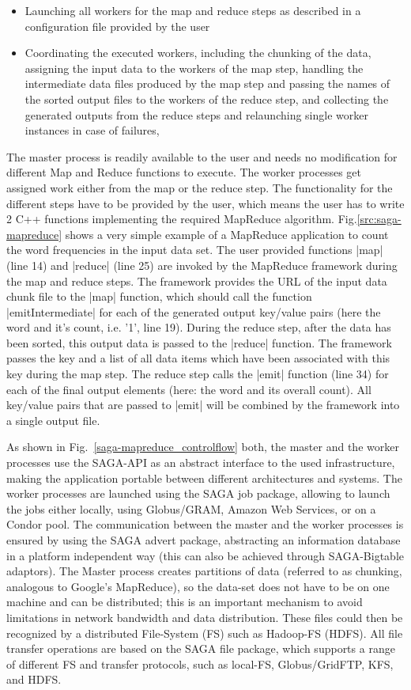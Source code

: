 \documentclass[conference,final]{IEEEtran}
\begin{document}
\begin{itemize}
\item Launching all workers for the map and reduce steps as described
  in a configuration file provided by the user 
\item Coordinating the executed workers, including the chunking of the
  data, assigning the input data to the workers of the map step,
  handling the intermediate data files produced by the map step and
  passing the names of the sorted output files to the workers of the
  reduce step, and collecting the generated outputs from the reduce
  steps and relaunching single worker instances in case of failures,
\end{itemize}

The master process is readily available to the user and needs no
modification for different Map and Reduce functions to execute.  The
worker processes get assigned work either from the map or the reduce
step. The functionality for the different steps have to be provided by
the user, which means the user has to write 2 C++ functions
implementing the required MapReduce algorithm.
Fig.\ref{src:saga-mapreduce} shows a very simple example of a
MapReduce application to count the word frequencies in the input data
set. The user provided functions |map| (line 14) and |reduce| (line
25) are invoked by the MapReduce framework during the map and reduce
steps. The framework provides the URL of the input data chunk file to
the |map| function, which should call the function |emitIntermediate|
for each of the generated output key/value pairs (here the word and
it's count, i.e. '1', line 19). During the reduce step, after the data
has been sorted, this output data is passed to the |reduce|
function. The framework passes the key and a list of all data items
which have been associated with this key during the map step. The
reduce step calls the |emit| function (line 34) for each of the final
output elements (here: the word and its overall count). All key/value
pairs that are passed to |emit| will be combined by the framework into
a single output file.

As shown in Fig.~\ref{saga-mapreduce_controlflow} both, the master and
the worker processes use the SAGA-API as an abstract interface to the
used infrastructure, making the application portable between different
architectures and systems. The worker processes are launched using the
SAGA job package, allowing to launch the jobs either locally, using
Globus/GRAM, Amazon Web Services, or on a Condor pool. The
communication between the master and the worker processes is ensured
by using the SAGA advert package, abstracting an information database
in a platform independent way (this can also be achieved through
SAGA-Bigtable adaptors).  The Master process creates partitions of
data (referred to as chunking, analogous to Google's MapReduce), so
the data-set does not have to be on one machine and can be
distributed; this is an important mechanism to avoid limitations in
network bandwidth and data distribution.  These files could then be
recognized by a distributed File-System (FS) such as Hadoop-FS
(HDFS). All file transfer operations are based on the SAGA file
package, which supports a range of different FS and transfer
protocols, such as local-FS, Globus/GridFTP, KFS, and HDFS.
\end{document}
